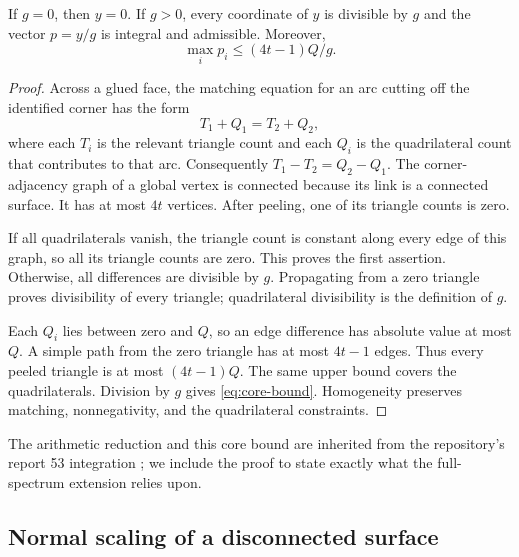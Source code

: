 \begin{lemma}
\label{lem:quad-core}
If $g=0$, then $y=0$. If $g>0$, every coordinate of $y$ is divisible by
$g$ and the vector $p=y/g$ is integral and admissible. Moreover,
\begin{equation}
 \max_i p_i\le (4t-1)Q/g.
 \label{eq:core-bound}
\end{equation}
\end{lemma}
\begin{proof}
Across a glued face, the matching equation for an arc cutting off the
identified corner has the form
\[
 T_1+Q_1=T_2+Q_2,
\]
where each $T_i$ is the relevant triangle count and each $Q_i$ is the
quadrilateral count that contributes to that arc. Consequently
$T_1-T_2=Q_2-Q_1$. The corner-adjacency graph of a global vertex is
connected because its link is a connected surface. It has at most $4t$
vertices. After peeling, one of its triangle counts is zero.

If all quadrilaterals vanish, the triangle count is constant along every
edge of this graph, so all its triangle counts are zero. This proves the
first assertion. Otherwise, all differences are divisible by $g$.
Propagating from a zero triangle proves divisibility of every triangle;
quadrilateral divisibility is the definition of $g$.

Each $Q_i$ lies between zero and $Q$, so an edge difference has absolute
value at most $Q$. A simple path from the zero triangle has at most
$4t-1$ edges. Thus every peeled triangle is at most $(4t-1)Q$.
The same upper bound covers the quadrilaterals. Division by $g$ gives
\eqref{eq:core-bound}. Homogeneity preserves matching, nonnegativity,
and the quadrilateral constraints.
\end{proof}

The arithmetic reduction and this core bound are inherited from the
repository's report 53 integration \cite{proveit-baseline}; we include the
proof to state exactly what the full-spectrum extension relies upon.

\subsection{Normal scaling of a disconnected surface}

